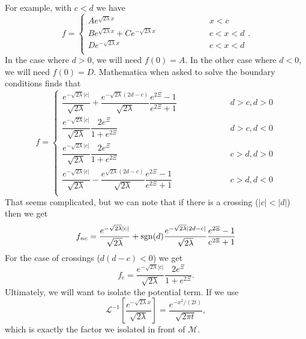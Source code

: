 For example, with $c<d$ we have 
\begin{equation}
f  = \left\{\begin{array}{ccr} A e^{\sqrt{2\lambda} x} & \hspace{2cm} & x<c\\
B e^{\sqrt{2\lambda} x} + C e^{-\sqrt{2\lambda} x}  & \hspace{2cm} & c<x<d\\
D e^{-\sqrt{2\lambda} x}& \hspace{2cm} & c<x<d\\
\end{array}
\right. .
\end{equation}
In the case where $d>0$, we will need $f(0) = A$.  In the other case where $d<0$, we will need $f(0) = D$.  
Mathematica when asked to solve the boundary conditions finds that 
\begin{equation}
f = \left\{ \begin{array}{ccr} 
\dfrac{e^{-\sqrt{2\lambda}|c|}}{\sqrt{2\lambda}} + \dfrac{e^{-\sqrt{2\lambda}(2d-c)}}{\sqrt{2\lambda}}\dfrac{e^{2\Xi}-1}{e^{2\Xi} +1}  &   \hspace{2cm}  & d>c,  d>0\\
\dfrac{ e^{-\sqrt{2\lambda}|c|}}{\sqrt{2\lambda}} \dfrac{2e^\Xi}{1 + e^{2\Xi}} & \hspace{2cm} & d>c,d<0 \\
\dfrac{ e^{-\sqrt{2\lambda}|c|}}{\sqrt{2\lambda}} \dfrac{2e^\Xi}{1 + e^{2\Xi}} & \hspace{2cm} & c>d,d>0 \\
\dfrac{ e^{-\sqrt{2\lambda}|c|}}{\sqrt{2\lambda}} - \dfrac{e^{\sqrt{2\lambda}(2d-c)}}{\sqrt{2\lambda}}\dfrac{e^{2\Xi}-1}{e^{2\Xi}+1} & \hspace{2cm} & c>d, d<0
\\
\end{array}
\right.
\end{equation}
That seems complicated, but we can note that if there is a crossing ($|c|<|d|$) then we get 
\begin{equation}
f_{nc}=\dfrac{e^{-\sqrt{2\lambda}|c|}}{\sqrt{2\lambda}} + \mathrm{sgn}(d)\dfrac{e^{-\sqrt{2\lambda}|2d-c|}}{\sqrt{2\lambda}}\dfrac{e^{2\Xi}-1}{e^{2\Xi} +1}
\end{equation}
For the case of crossings ($d(d-c)<0$) we get
\begin{equation}
f_c = \dfrac{ e^{-\sqrt{2\lambda}|c|}}{\sqrt{2\lambda}} \dfrac{2e^\Xi}{1 + e^{2\Xi}}.
\end{equation}
Ultimately, we will want to isolate the potential term.  
If we use 
\begin{equation}
\mathcal{L}^{-1}\left[ \frac{e^{-\sqrt{2\lambda}x}}{\sqrt{2\lambda}}   \right] = \frac{e^{-x^2/(2t)}}{\sqrt{2\pi t}},
\end{equation}
which is exactly the factor we isolated in front of $\mathcal{M}$.  

